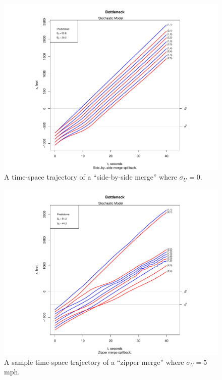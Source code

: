 \documentclass[Proceedings]{ascelike}
\begin{document}
\begin{figure}
\centering
\includegraphics[width = 5.5in]{Rplot04.pdf}
\caption{A time-space trajectory of a ``side-by-side merge''  where $\sigma_U = 0$.}
\label{sbs0}
\end{figure}

\begin{figure}
\centering
\includegraphics[width = 5.5in]{Rplot09.pdf}
\caption{A sample time-space trajectory of a  ``zipper merge'' where  $\sigma_U = 5$ mph.}
\label{zip5}
\end{figure}
\end{document}
